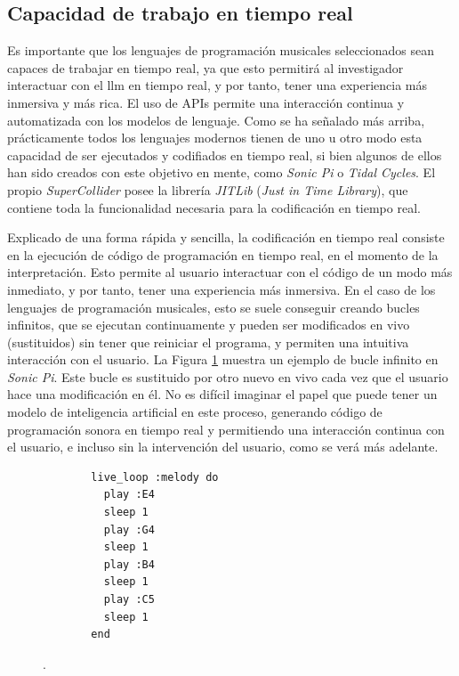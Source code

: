 \subsection{Capacidad de trabajo en tiempo real}
Es importante que los lenguajes de programación musicales seleccionados sean capaces de trabajar en tiempo real, ya que esto permitirá al investigador interactuar con el \gls{llm} en tiempo real, y por tanto, tener una experiencia más inmersiva y más rica. El uso de APIs permite una interacción continua y automatizada con los modelos de lenguaje. Como se ha señalado más arriba, prácticamente todos los lenguajes modernos tienen de uno u otro modo esta capacidad de ser ejecutados y codifiados en tiempo real, si bien algunos de ellos han sido creados con este objetivo en mente, como \textit{Sonic Pi} o \textit{Tidal Cycles}. El propio \textit{SuperCollider} posee la librería \textit{JITLib} (\textit{Just in Time Library}), que contiene toda la funcionalidad necesaria para la codificación en tiempo real.

Explicado de una forma rápida y sencilla, la codificación en tiempo real consiste en la ejecución de código de programación en tiempo real, en el momento de la interpretación. Esto permite al usuario interactuar con el código de un modo más inmediato, y por tanto, tener una experiencia más inmersiva. En el caso de los lenguajes de programación musicales, esto se suele conseguir creando bucles infinitos, que se ejecutan continuamente y pueden ser modificados en vivo (sustituidos) sin tener que reiniciar el programa, y permiten una intuitiva interacción con el usuario. La Figura \ref{fig:sonic_pi_loop} muestra un ejemplo de bucle infinito en \textit{Sonic Pi}. Este bucle es sustituido por otro nuevo en vivo cada vez que el usuario hace una modificación en él. No es difícil imaginar el papel que puede tener un modelo de inteligencia artificial en este proceso, generando código de programación sonora en tiempo real y permitiendo una interacción continua con el usuario, e incluso sin la intervención del usuario, como se verá más adelante.


\begin{figure}[h]
  \caption[Bucle infinito en \textit{Sonic Pi}]{Bucle infinito en \textit{Sonic Pi}. En este código se ejecutan cuatro notas (con la sentencia \texttt{play}), una por segundo (tiempo indicado a \texttt{sleep}) en un bucle infinito. El usuario puede modificar las notas, y el cambio se ejecuta en el siguiente ciclo del bucle.}
  \centering
  \begin{subfigure}{.5\textwidth}
  \begin{mdframed}
  \begin{verbatim}
  live_loop :melody do
    play :E4
    sleep 1
    play :G4
    sleep 1
    play :B4
    sleep 1
    play :C5
    sleep 1
  end
  \end{verbatim}
  \end{mdframed}
  \end{subfigure}
  .
  \label{fig:sonic_pi_loop}
\end{figure}

